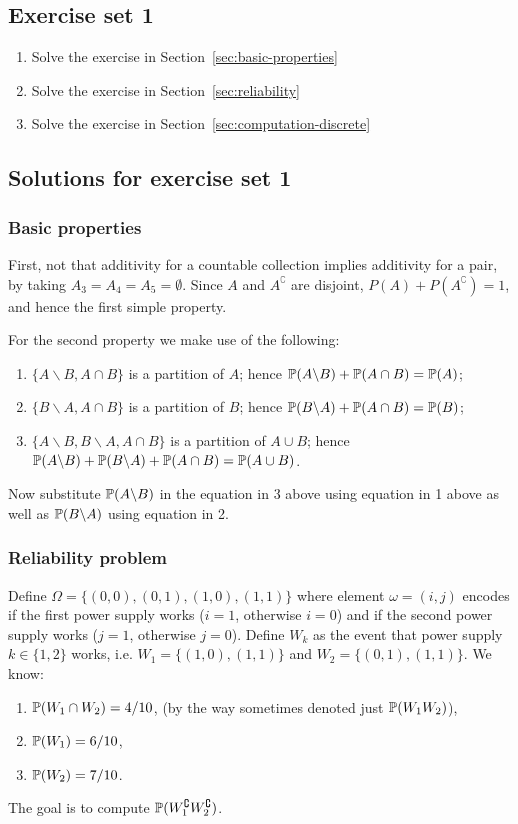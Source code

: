 \documentclass{article}
\begin{document}
\subsection{Exercise set 1}

\begin{enumerate}
	\item Solve the exercise in Section~\ref{sec:basic-properties}
	\item Solve the exercise in Section~\ref{sec:reliability}
	\item Solve the exercise in Section~\ref{sec:computation-discrete}
\end{enumerate}


\subsection{Solutions for exercise set 1}

\subsubsection{Basic properties}

First, not that additivity for a countable collection implies additivity for a pair, by taking $A_3 = A_4 = A_5 = \emptyset$. Since $A$ and $A^\complement$ are disjoint, $P(A) + P(A^\complement) = 1$, and hence the first simple property. 

For the second property we make use of the following:
\begin{enumerate}
	\item $\{A\backslash B, A \cap B\}$ is a partition of $A$; hence $\P(A\backslash B) + \P(A \cap B) = \P(A)$;
	\item $\{B\backslash A, A \cap B\}$ is a partition of $B$; hence $\P(B\backslash A) + \P(A \cap B) = \P(B)$;
	\item $\{A\backslash B, B \backslash A, A \cap B\}$ is a partition of $A \cup B$;  hence $\P(A\backslash B) + \P(B\backslash A)+ \P(A \cap B) = \P(A \cup B)$.
\end{enumerate}
Now substitute $\P(A\backslash B)$ in the equation in 3 above using equation in 1 above as well as $\P(B\backslash A)$ using equation in 2.


\subsubsection{Reliability problem}

Define $\Omega = \{(0,0), (0,1), (1,0), (1,1)\}$ where element $\omega = (i, j)$ encodes if the first power supply works ($i = 1$, otherwise $i=0$) and if the second power supply works ($j = 1$, otherwise $j=0$). Define $W_k$ as the event that power supply $k\in \{1, 2\}$ works, i.e. $W_1 = \{(1,0), (1,1)\}$ and $W_2 = \{(0,1), (1,1)\}$. We know:
\begin{enumerate}
	\item $\P(W_1 \cap W_2) = 4/10$, (by the way sometimes denoted just $\P(W_1 W_2)$), 
	\item $\P(W_1) = 6/10$,
	\item $\P(W_2) = 7/10$.
\end{enumerate}
The goal is to compute $\P(W_1^\complement W_2^\complement)$. 
\end{document}

